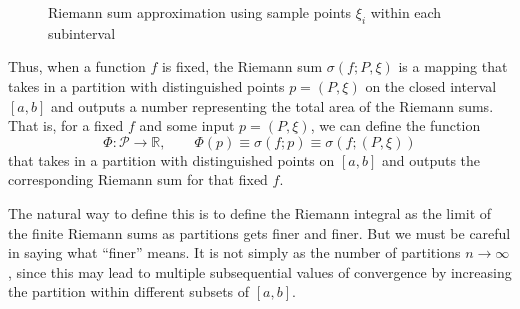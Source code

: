 \begin{definition}
\begin{figure}[H]
        \caption{Riemann sum approximation using sample points $\xi_i$ within each subinterval}
        \label{fig:riemann-sum-xi}
      \end{figure}

      Thus, when a function $f$ is fixed, the Riemann sum $\sigma (f; P, \xi)$ is a mapping that takes in a partition with distinguished points $p = (P, \xi)$ on the closed interval $[a, b]$ and outputs a number representing the total area of the Riemann sums. That is, for a fixed $f$ and some input $p = (P, \xi)$, we can define the function 
      \[\Phi: \mathcal{P} \longrightarrow \mathbb{R}, \qquad \Phi(p) \equiv \sigma(f; p) \equiv \sigma(f; (P, \xi))\]
      that takes in a partition with distinguished points on $[a,b]$ and outputs the corresponding Riemann sum for that fixed $f$. 
    \end{definition} 

    The natural way to define this is to define the Riemann integral as the limit of the finite Riemann sums as partitions gets finer and finer.  But we must be careful in saying what ``finer'' means. It is not simply as the number of partitions $n \rightarrow \infty$, since this may lead to multiple subsequential values of convergence by increasing the partition within different subsets of $[a,b]$. 

